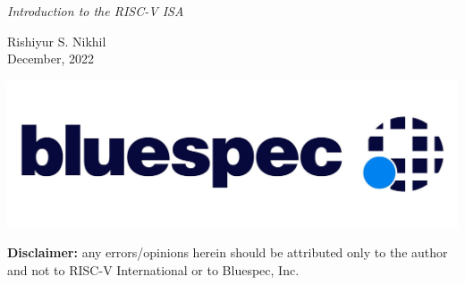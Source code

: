 \documentclass{article}
\begin{document}

\vspace*{1in}

\begin{center}\Huge
  \emph{Introduction to the RISC-V ISA}

  \vspace*{0.5in}

  Rishiyur S. Nikhil \\
  December, 2022

  \vspace*{1in}

  \includegraphics{Figs/Bluespec_Logo_2022-10.jpg}

  \vfill

  \begin{minipage}{7in}\Large
    {\bf Disclaimer:} any errors/opinions herein should be attributed
    only to the author and not to RISC-V International or to
    Bluespec, Inc.
  \end{minipage}

\end{center}

\clearpage

\end{document}
